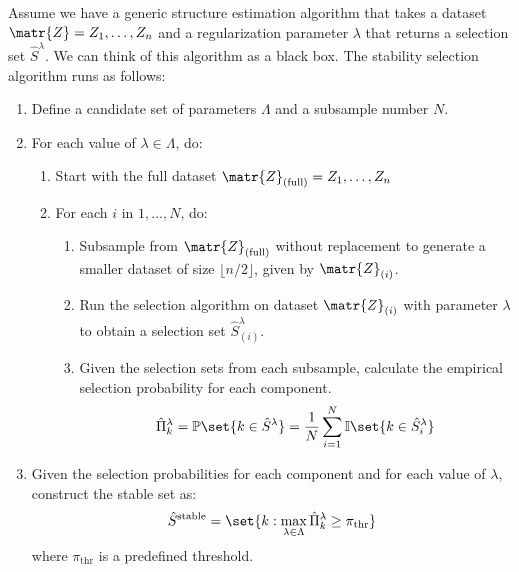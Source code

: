 Assume we have a generic structure estimation algorithm that takes a dataset $\matr{Z} = Z_1,\ldots,Z_n$ and a regularization parameter $\lambda$ that returns a selection set $\hat{S}^{\lambda}$. We can think of this algorithm as a black box. The stability selection algorithm runs as follows:
\begin{enumerate}
    \item Define a candidate set of parameters $\Lambda$ and a subsample number $N$.
    \item For each value of $\lambda\in\Lambda$, do:
    \begin{enumerate}
        \item Start with the full dataset $\matr{Z}_{(\text{full})} = Z_1,\ldots,Z_n$
        \item For each $i$ in $1,\ldots,N$, do:
        \begin{enumerate}
            \item Subsample from $\matr{Z}_{(\text{full})}$ without replacement to generate a smaller dataset of size $\lfloor n/2 \rfloor$, given by $\matr{Z}_{(i)}$.
            \item Run the selection algorithm on dataset $\matr{Z}_{(i)}$ with parameter $\lambda$ to obtain a selection set $\hat{S}_{(i)}^{\lambda}$.
            \item Given the selection sets from each subsample, calculate the empirical selection probability for each component.
            \begin{equation}
                \hat{\Pi}_k^{\lambda} = \mathbb{P}\set{k\in\hat{S}^{\lambda}} = \frac{1}{N}\sum_{i=1}^N\mathbb{I}\set{k\in\hat{S}_i^{\lambda}}
            \end{equation}
        \end{enumerate}
    \end{enumerate}
    \item Given the selection probabilities for each component and for each value of $\lambda$, construct the stable set as:
    \begin{equation}
        \hat{S}^{\text{stable}} = \set{k:\max_{\lambda\in\Lambda}\hat{\Pi}_k^{\lambda} \geq \pi_{\text{thr}}}
    \end{equation}
    where $\pi_{\text{thr}}$ is a predefined threshold.
\end{enumerate}

